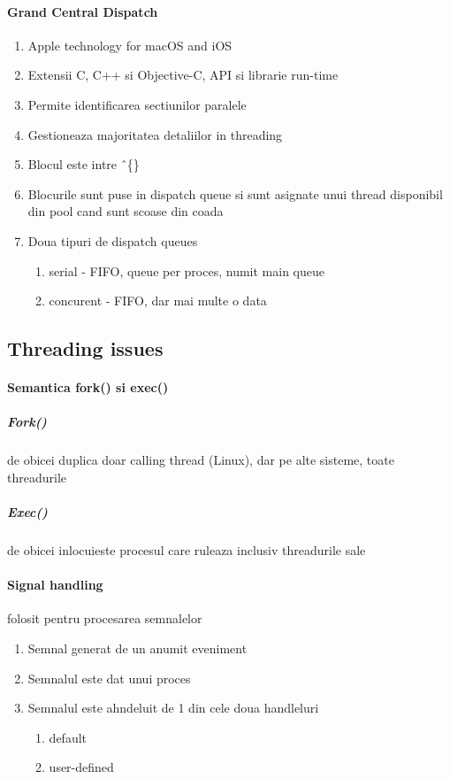 \documentclass{article}
\begin{document}
\paragraph*{Grand Central Dispatch}
\begin{enumerate}
    \item Apple technology for macOS and iOS
    \item Extensii C, C++ si Objective-C, API si librarie run-time
    \item Permite identificarea sectiunilor paralele
    \item Gestioneaza majoritatea detaliilor in threading
    \item Blocul este intre \^\ \{\}
    \item Blocurile sunt puse in dispatch queue si sunt asignate unui thread disponibil din pool cand sunt scoase din coada
    \item Doua tipuri de dispatch queues
          \begin{enumerate}
              \item serial - FIFO, queue per proces, numit main queue
              \item concurent - FIFO, dar mai multe o data
          \end{enumerate}
\end{enumerate}

\subsection*{Threading issues}
\paragraph*{Semantica fork() si exec()}
\subparagraph*{Fork()} de obicei duplica doar calling thread (Linux), dar pe alte sisteme, toate threadurile
\subparagraph*{Exec()} de obicei inlocuieste procesul care ruleaza inclusiv threadurile sale

\paragraph*{Signal handling} folosit pentru procesarea semnalelor
\begin{enumerate}
    \item Semnal generat de un anumit eveniment
    \item Semnalul este dat unui proces
    \item Semnalul este ahndeluit de 1 din cele doua handleluri
          \begin{enumerate}
              \item default
              \item user-defined
          \end{enumerate}
\end{enumerate}
\end{document}
